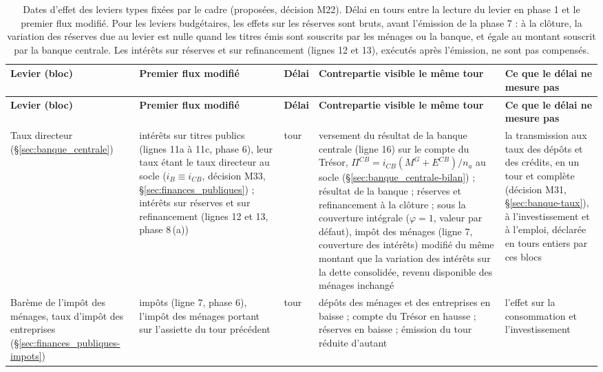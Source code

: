\documentclass[11pt,a4paper]{article}
\begin{document}
\begin{center}\small
\begin{longtable}{>{\raggedright\arraybackslash}p{2.3cm}>{\raggedright\arraybackslash}p{3.0cm}>{\raggedright\arraybackslash}p{1.1cm}>{\raggedright\arraybackslash}p{4.7cm}>{\raggedright\arraybackslash}p{2.9cm}}
\caption{Dates d'effet des leviers types fixées par le cadre (proposées, décision M22). Délai en tours entre la lecture du levier en phase 1 et le premier flux modifié. Pour les leviers budgétaires, les effets sur les réserves sont bruts, avant l'émission de la phase 7 : à la clôture, la variation des réserves due au levier est nulle quand les titres émis sont souscrits par les ménages ou la banque, et égale au montant souscrit par la banque centrale. Les intérêts sur réserves et sur refinancement (lignes 12 et 13), exécutés après l'émission, ne sont pas compensés.}\label{tab:leviers-cadre}\\
\toprule
\textbf{Levier (bloc)} & \textbf{Premier flux modifié} & \textbf{Délai} & \textbf{Contrepartie visible le même tour} & \textbf{Ce que le délai ne mesure pas}\\
\midrule
\endfirsthead
\toprule
\textbf{Levier (bloc)} & \textbf{Premier flux modifié} & \textbf{Délai} & \textbf{Contrepartie visible le même tour} & \textbf{Ce que le délai ne mesure pas}\\
\midrule
\endhead
Taux directeur (\S\ref{sec:banque_centrale}) & intérêts sur titres publics (lignes 11a à 11c, phase 6), leur taux étant le taux directeur au socle ($i_B \equiv i_{\mathit{CB}}$, décision M33, \S\ref{sec:finances_publiques}) ; intérêts sur réserves et sur refinancement (lignes 12 et 13, phase 8\,(a)) & 0 tour & versement du résultat de la banque centrale (ligne 16) sur le compte du Trésor, $\Pi^{\mathit{CB}} = i_{\mathit{CB}}(M^G + E^{\mathit{CB}})/n_a$ au socle (\S\ref{sec:banque_centrale-bilan}) ; résultat de la banque ; réserves et refinancement à la clôture ; sous la couverture intégrale ($\varphi = 1$, valeur par défaut), impôt des ménages (ligne 7, couverture des intérêts) modifié du même montant que la variation des intérêts sur la dette consolidée, revenu disponible des ménages inchangé & la transmission aux taux des dépôts et des crédits, en un tour et complète (décision M31, \S\ref{sec:banque-taux}), à l'investissement et à l'emploi, déclarée en tours entiers par ces blocs\\
Barème de l'impôt des ménages, taux d'impôt des entreprises (\S\ref{sec:finances_publiques-impots}) & impôts (ligne 7, phase 6), l'impôt des ménages portant sur l'assiette du tour précédent & 0 tour & dépôts des ménages et des entreprises en baisse ; compte du Trésor en hausse ; réserves en baisse ; émission du tour réduite d'autant & l'effet sur la consommation et l'investissement\\

\end{longtable}
\end{center}
\end{document}
